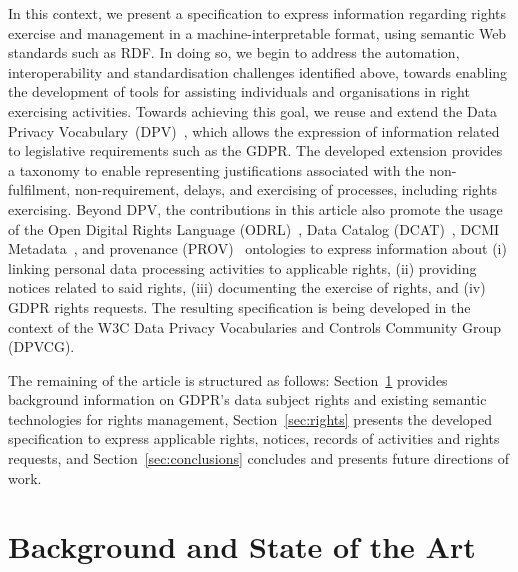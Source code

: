 \documentclass{IOS-Book-Article}     %
\begin{document}
In this context, we present a specification to express information regarding rights exercise and management in a machine-interpretable format, using semantic Web standards such as RDF.
In doing so, we begin to address the automation, interoperability and standardisation challenges identified above, towards enabling the development of tools for assisting individuals and organisations in right exercising activities. 
Towards achieving this goal, we reuse and extend the Data Privacy Vocabulary~(DPV)~\cite{pandit2024dpv}, which allows the expression of information related to legislative requirements such as the GDPR.
The developed extension provides a taxonomy to enable representing justifications associated with the non-fulfilment, non-requirement, delays, and exercising of processes, including rights exercising.
Beyond DPV, the contributions in this article also promote the usage of the Open Digital Rights Language (ODRL)~\cite{iannella_odrl_2018}, Data Catalog (DCAT)~\cite{albertoni_dcat_2024}, DCMI Metadata~\cite{dcmi_2020}, and provenance (PROV)~\cite{lebo_prov_2013} ontologies to express information about 
(i) linking personal data processing activities to applicable rights,
(ii) providing notices related to said rights,
(iii) documenting the exercise of rights, and
(iv) GDPR rights requests.
The resulting specification is being developed in the context of the W3C Data Privacy Vocabularies and Controls Community Group (DPVCG).

The remaining of the article is structured as follows: Section~\ref{sec:sota} provides background information on GDPR's data subject rights and existing semantic technologies for rights management, Section~\ref{sec:rights} presents the developed specification to express applicable rights, notices, records of activities and rights requests, and Section~\ref{sec:conclusions} concludes and presents future directions of work.

\section{Background and State of the Art}
\label{sec:sota}
\end{document}
